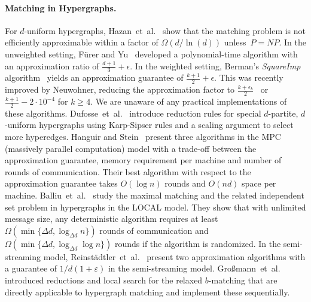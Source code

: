 \documentclass[runningheads]{llncs}
\begin{document}
\paragraph{Matching in Hypergraphs.}
For $d$-uniform hypergraphs, Hazan~et~al.~\cite{approxresult} show that the matching problem is not efficiently approximable within a factor of $\Omega(d / \ln(d))$ unless~$P = NP$.
In the unweighted setting, Fürer and Yu~\cite{fuerer2014} developed a polynomial-time algorithm  with an approximation ratio of $\frac{d + 1}{3} + \epsilon$.
In the weighted setting, Berman's \emph{SquareImp} algorithm~\cite{10.1007/3-540-44985-X_19} yields an approximation guarantee of $\frac{k + 1}{2} + \epsilon$. %
This was recently improved by Neuwohner, reducing the approximation factor to $\frac{k + \epsilon_k}{2}$~\cite{DBLP:journals/corr/abs-2106-03555} or $\frac{k + 1}{2} - 2 \cdot 10^{-4}$ for $k \geq 4$\cite{neuwohner2023passing}. We are unaware of any practical implementations of these algorithms.
Dufosse~et~al.~\cite{dufosse2019effective} introduce reduction rules for special $d$-partite, $d$-uniform hypergraphs using Karp-Sipser rules and a scaling argument to select more hyperedges.
Hanguir and Stein~\cite{hanguir2021distributed} present three algorithms in the MPC (massively parallel computation) model with a trade-off between the approximation guarantee, memory requirement per machine and number of rounds of communication.
Their best algorithm with respect to the approximation guarantee takes $O(\log{n})$ rounds and $O(nd)$ space per machine.
Balliu~et~al.~\cite{balliu2023distributed} study the maximal matching and the related independent set problem in hypergraphs in the LOCAL model. They show that with unlimited message size, any deterministic algorithm requires at least $\Omega(\min\{\Delta d, \log_{\Delta d}{n}\})$ rounds of communication and $\Omega(\min\{\Delta d, \log_{\Delta d}{\log {n}}\})$ rounds if the algorithm is randomized.
In the semi-streaming model, Reinstädtler~et~al.~\cite{reinstadtler2025semi} present two approximation algorithms with a guarantee of $1/d(1+\varepsilon)$ in the semi-streaming model. 
Großmann~et~al.~\cite{grossmann2024engineering} introduced reductions and local search for the relaxed $b$-matching that are directly applicable to hypergraph matching and implement these sequentially.
\end{document}
